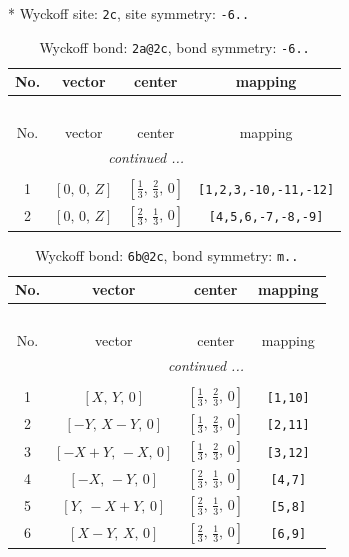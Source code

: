\documentclass[fleqn,8pt]{jsarticle}
\begin{document}
* Wyckoff site: {\tt 2c}, site symmetry: {\tt -6..}
\renewcommand{\arraystretch}{1.2}
\begin{longtable}{cccc}
\caption{Wyckoff bond: {\tt 2a@2c}, bond symmetry: {\tt -6..}}
 \\
 \hline \hline
No. & vector & center & mapping \\ \hline \endfirsthead

\multicolumn{3}{l}{\tablename\ \thetable{}} \\
 \hline \hline
No. & vector & center & mapping \\ \hline \endhead

 \hline \hline
\multicolumn{3}{r}{\footnotesize\it continued ...} \\ \endfoot

 \hline \hline
\multicolumn{3}{r}{} \\ \endlastfoot

1 & $\left[ 0,\, 0,\, Z \right]$ & $\left[ \frac{1}{3},\, \frac{2}{3},\, 0 \right]$ & {\tt [1,2,3,-10,-11,-12]} \\ \hline
2 & $\left[ 0,\, 0,\, Z \right]$ & $\left[ \frac{2}{3},\, \frac{1}{3},\, 0 \right]$ & {\tt [4,5,6,-7,-8,-9]} \\
\end{longtable}
\renewcommand{\arraystretch}{1.2}
\begin{longtable}{cccc}
\caption{Wyckoff bond: {\tt 6b@2c}, bond symmetry: {\tt m..}}
 \\
 \hline \hline
No. & vector & center & mapping \\ \hline \endfirsthead

\multicolumn{3}{l}{\tablename\ \thetable{}} \\
 \hline \hline
No. & vector & center & mapping \\ \hline \endhead

 \hline \hline
\multicolumn{3}{r}{\footnotesize\it continued ...} \\ \endfoot

 \hline \hline
\multicolumn{3}{r}{} \\ \endlastfoot

1 & $\left[ X,\, Y,\, 0 \right]$ & $\left[ \frac{1}{3},\, \frac{2}{3},\, 0 \right]$ & {\tt [1,10]} \\ \hline
2 & $\left[ - Y,\, X - Y,\, 0 \right]$ & $\left[ \frac{1}{3},\, \frac{2}{3},\, 0 \right]$ & {\tt [2,11]} \\ \hline
3 & $\left[ - X + Y,\, - X,\, 0 \right]$ & $\left[ \frac{1}{3},\, \frac{2}{3},\, 0 \right]$ & {\tt [3,12]} \\ \hline
4 & $\left[ - X,\, - Y,\, 0 \right]$ & $\left[ \frac{2}{3},\, \frac{1}{3},\, 0 \right]$ & {\tt [4,7]} \\ \hline
5 & $\left[ Y,\, - X + Y,\, 0 \right]$ & $\left[ \frac{2}{3},\, \frac{1}{3},\, 0 \right]$ & {\tt [5,8]} \\ \hline
6 & $\left[ X - Y,\, X,\, 0 \right]$ & $\left[ \frac{2}{3},\, \frac{1}{3},\, 0 \right]$ & {\tt [6,9]} \\
\end{longtable}
\end{document}
